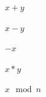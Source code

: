 \documentclass[a4paper,10pt,fleqn]{article}
\begin{document}
\noindent
$x + y$


\noindent
$x - y$


\noindent
$-x$


\noindent
$x * y$


\noindent
$x \mod n$
\end{document}
